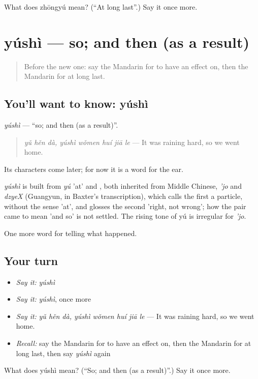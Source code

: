 \begin{tcolorbox}[breakable,colback=teal!4,colframe=teal!35!black,title={Before you move on}]
What does zhōngyú mean? (\textquotedblleft{}At long last\textquotedblright{}.) Say it once more.
\end{tcolorbox}
\section[yúshì]{yúshì — so; and then (as a result)}

\label{lesson:ZH-C294-yushi}



\begin{quote}
Before the new one: say the Mandarin for to have an effect on, then the Mandarin for at long last.
\end{quote}

\subsection*{You'll want to know: yúshì}
\emph{yúshì} — \textquotedblleft{}so; and then (as a result)\textquotedblright{}.

\begin{quote}
\emph{yǔ hěn dà, yúshì wǒmen huí jiā le} — It was raining hard, so we went home.
\end{quote}

Its characters come later; for now it is a word for the ear.

\begin{cousinweb}
\emph{yúshì} is built from \emph{yú} 'at' and , both inherited from Middle Chinese, \emph{'jo} and \emph{dzyeX} (Guangyun, in Baxter's transcription), which calls the first a particle, without the sense 'at', and glosses the second 'right, not wrong'; how the pair came to mean 'and so' is not settled. The rising tone of yú is irregular for \emph{'jo}.
\end{cousinweb}

\begin{grammarlens}[title={What you've built}]
One more word for telling what happened.
\end{grammarlens}

\subsection*{Your turn}
\begin{itemize}
\raggedright
  \item \emph{Say it:} \emph{yúshì}
  \item \emph{Say it:} \emph{yúshì}, once more
  \item \emph{Say it:} \emph{yǔ hěn dà, yúshì wǒmen huí jiā le} — It was raining hard, so we went home.
  \item \emph{Recall:} say the Mandarin for to have an effect on, then the Mandarin for at long last, then say \emph{yúshì} again
\end{itemize}

\begin{tcolorbox}[breakable,colback=teal!4,colframe=teal!35!black,title={Before you move on}]
What does yúshì mean? (\textquotedblleft{}So; and then (as a result)\textquotedblright{}.) Say it once more.
\end{tcolorbox}
